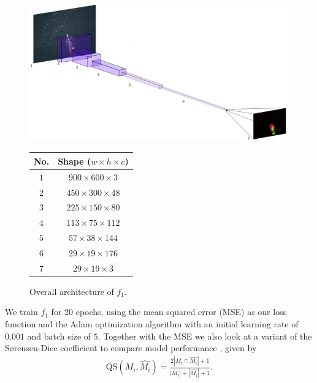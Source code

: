 \documentclass{IET}%
\begin{document}
\begin{figure}
\centering
\begin{minipage}[t]{0.6\textwidth}
\centering
\vspace{0pt}
\centering
\includegraphics[width=\textwidth]{images/fcn/deconv4.png}
\label{fig:nn}
\caption{Overall architecture of $f_1$.}
\end{minipage}\hfill
\begin{minipage}[t]{.3\textwidth}
\centering
\vspace{20pt}
\begin{tabular}{|c||c|}
\hline
  No. & Shape ($w\times h\times c$) \\
    \hline
    \hline
    $1$ & $900 \times 600 \times 3$   \\
    $2$ & $450 \times 300 \times 48$  \\
    $3$ & $225 \times 150 \times 80$  \\ 
    $4$ & $113 \times 75 \times 112$ \\
    $5$ & $57 \times 38 \times 144$ \\
    $6$ &  $29 \times 19 \times 176$ \\
    $7$ &  $29 \times 19 \times 3$ \\
    \hline
    
\end{tabular}
\label{tab:f1shapes}
\end{minipage}
\end{figure}
We train $f_1$ for 20 epochs, using the mean squared error (MSE) as our loss function and the Adam optimization algorithm with an initial learning rate of $0.001$ and batch size of $5$. Together with the MSE we also look at a variant of the S{\o}rensen-Dice coefficient to compare model performance \cite{sorensen1948method}, given by
\begin{align}\label{dice}
\text{QS}(M_i,\hat{M_i})={\frac {2|M_i \cap \hat{M_i}| + 1}{|M_i|+|\hat{M_i}|+1}}.
\end{align}
\end{document}
